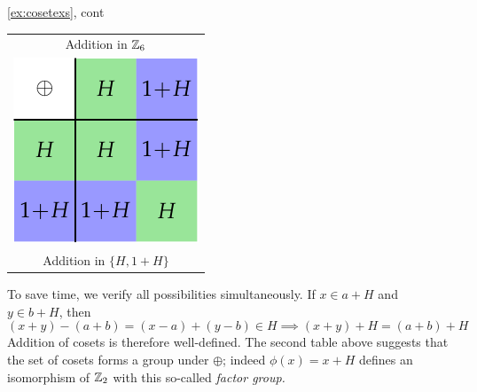 \begin{examples*}{\ref{ex:cosetexs}, cont}{}
\begin{enumerate}
\begin{minipage}[t]{0.25\linewidth}
\begin{tabular}{@{}c@{}}
				Addition in $\mathbb{Z}_6$\\[5pt]
				\includegraphics[scale=0.9]{factor-z6-2}\\
				Addition in $\{H,1+H\}$
			\end{tabular}
		\end{minipage}\smallbreak
		To save time, we verify all possibilities simultaneously. If $x\in a+H$ and $y\in b+H$, then
		\[
			(x+y)-(a+b)=(x-a)+(y-b)\in H\implies (x+y)+H=(a+b)+H
		\]
		Addition of cosets is therefore well-defined. The second table above suggests that the set of cosets forms a group under $\oplus$; indeed $\phi(x)=x+H$ defines an isomorphism of $\mathbb{Z}_2$ with this so-called \emph{factor group.}
	

\end{enumerate}
\end{examples*}
